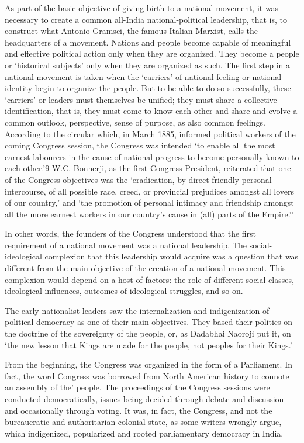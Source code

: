 As part of the basic objective of giving birth to a national movement, it was necessary to create a common all-India national-political leadership, that is, to construct what Antonio Gramsci, the famous Italian Marxist, calls the headquarters of a movement. Nations and people become capable of meaningful and effective political action only when they are organized. They become a people or `historical subjects' only when they are organized as such. The first step in a national movement is taken when the `carriers' of national feeling or national identity begin to organize the people. But to be able to do so successfully, these `carriers' or leaders must themselves be unified; they must share a collective identification, that is, they must come to know each other and share and evolve a common outlook, perspective, sense of purpose, as also common feelings. According to the circular which, in March 1885, informed political workers of the coming Congress session, the Congress was intended `to enable all the most earnest labourers in the cause of national progress to become personally known to each other.'9 W.C. Bonnerji, as the first Congress President, reiterated that one of the Congress objectives was the `eradication, by direct friendly personal intercourse, of all possible race, creed, or provincial prejudices amongst all lovers of our country,' and `the promotion of personal intimacy and friendship amongst all the more earnest workers in our country's cause in (all) parts of the Empire.''

In other words, the founders of the Congress understood that the first requirement of a national movement was a national leadership. The social- ideological complexion that this leadership would acquire was a question that was different from the main objective of the creation of a national movement. This complexion would depend on a host of factors: the role of different social classes, ideological influences, outcomes of ideological struggles, and so on.

The early nationalist leaders saw the internalization and indigenization of political democracy as one of their main objectives. They based their politics on the doctrine of the sovereignty of the people, or, as Dadabhai Naoroji put it, on `the new lesson that Kings are made for the people, not peoples for their Kings.'

From the beginning, the Congress was organized in the form of a Parliament. In fact, the word Congress was borrowed from North American history to connote an assembly of the' people. The proceedings of the Congress sessions were conducted democratically, issues being decided through debate and discussion and occasionally through voting. It was, in fact, the Congress, and not the bureaucratic and authoritarian colonial state, as some writers wrongly argue, which indigenized, popularized and rooted parliamentary democracy in India.

